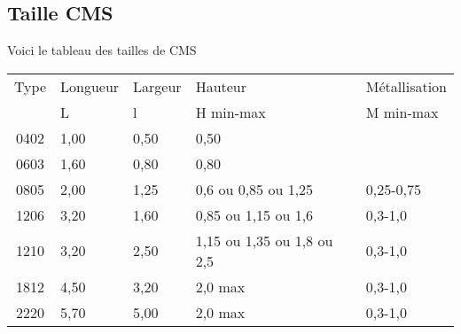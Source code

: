 \documentclass{EPSA-rap-template}
\newcommand{\includepdfscale}{0.84}
\begin{document}
\subsection{Taille CMS}

Voici le tableau des tailles de CMS

{
\centering
\begin{tabular}{cllll}
Type &	Longueur & Largeur & Hauteur  & Métallisation  \\
& L & l &H min-max   & M min-max \\
0402 &	1,00 &  0,50 &	0,50 &  \\	 
0603 & 	1,60 & 	0,80 & 	0,80 & \\	 
0805 &	2,00 &	1,25 &	0,6 ou 0,85 ou 1,25 & 0,25-0,75 \\
1206 &	3,20 &	1,60 &	0,85 ou 1,15 ou 1,6 &	0,3-1,0 \\
1210 &	3,20 &	2,50 &	1,15 ou 1,35 ou 1,8 ou 2,5 &	0,3-1,0\\
1812 &	4,50 & 	3,20 &	2,0 max &	0,3-1,0\\
2220 &	5,70 &	5,00 &	2,0 max &	0,3-1,0\\
\end{tabular}

\par
}











\end{document}
